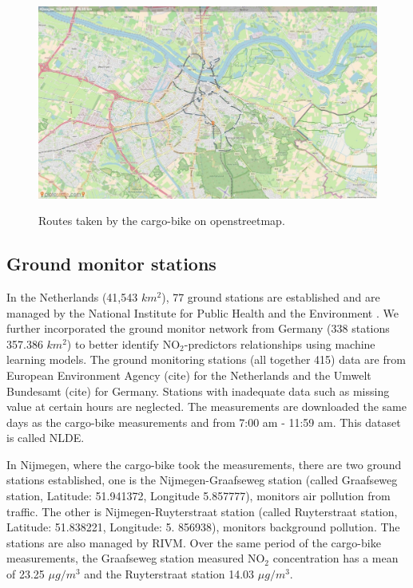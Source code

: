 \documentclass{article}
\begin{document}
\begin{figure}
    \includegraphics[width=\linewidth]{f1b.jpg}
    \label{route}
    \caption {Routes taken by the cargo-bike on openstreetmap\citep{openstreetmap}.}
\end{figure}

\subsection{Ground monitor stations}

In the Netherlands (41,543 $km^2$), 77 ground stations are established and are managed by the National Institute for Public Health and the Environment \citep[RIVM,][]{RIVMLML}. We further incorporated the ground monitor network from Germany (338 stations 357.386 $km^2$) to better identify NO$_2$-predictors relationships using machine learning models. The ground monitoring stations (all together 415) data are from European Environment Agency (cite) for the Netherlands and the Umwelt Bundesamt (cite) for Germany. Stations with inadequate data such as missing value at certain hours are neglected. The measurements are downloaded the same days as the cargo-bike measurements and from 7:00 am - 11:59 am. This dataset is called NLDE.

In Nijmegen, where the cargo-bike took the measurements, there are two ground stations established, one is the Nijmegen-Graafseweg station (called Graafseweg station, Latitude: 51.941372, Longitude 5.857777), monitors air pollution from traffic. The other is Nijmegen-Ruyterstraat station (called Ruyterstraat station, Latitude: 51.838221, Longitude: 5. 856938), monitors background pollution. The stations are also managed by RIVM. Over the same period of the cargo-bike measurements, the Graafseweg station measured NO$_2$ concentration has a mean of 23.25 $\mu g/m^3$ and the Ruyterstraat station 14.03 $\mu g/m^3$.
 
\end{document}
